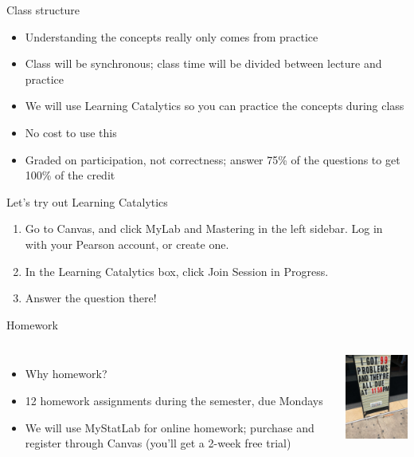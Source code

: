 \documentclass{beamer}\usepackage[]{graphicx}\usepackage[]{color}
\begin{document}
\begin{darkframes}
    \begin{frame}{Class structure}
      \begin{itemize}
        \item Understanding the concepts really only comes from practice
        \item Class will be synchronous; class time will be divided between lecture and practice
        \item We will use \alert{Learning Catalytics} so you can practice the concepts during class
        \item No cost to use this
        \item Graded on participation, not correctness; answer 75\% of the questions to get 100\% of the credit
      \end{itemize}
    \end{frame}

    
    \begin{frame}{Let's try out Learning Catalytics}
      \begin{enumerate}
        \item Go to Canvas, and click \alert{MyLab and Mastering} in the left sidebar. Log in with your Pearson account, or create one.
        \item In the Learning Catalytics box, click \alert{Join Session in Progress}.
        \item Answer the question there!
      \end{enumerate}
    \end{frame}


    \begin{frame}{Homework}
      \begin{columns}[onlytextwidth]
          \begin{itemize}
            \item Why homework?
            \item 12 homework assignments during the semester, due Mondays
            \item We will use \alert{MyStatLab} for online homework; purchase and register through Canvas (you'll get a 2-week free trial)
          \end{itemize}
          \includegraphics[width=1.5in]{99problems}
      \end{columns}
    \end{frame}
    


\end{darkframes}
\end{document}
